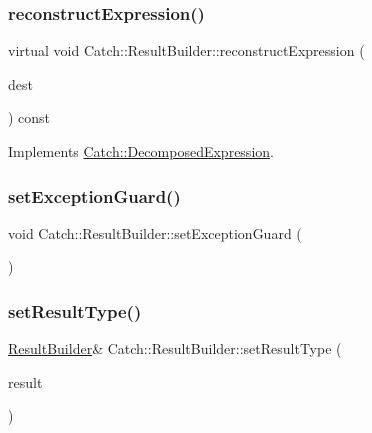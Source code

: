 \mbox{\label{class_catch_1_1_result_builder_a7d94b15cf04301a8617e7b16158b5d82}} 
\subsubsection{\texorpdfstring{reconstruct\+Expression()}{reconstructExpression()}}
{\footnotesize\ttfamily virtual void Catch\+::\+Result\+Builder\+::reconstruct\+Expression (\begin{DoxyParamCaption}\item[{\textbf{ std\+::string} \&}]{dest }\end{DoxyParamCaption}) const\hspace{0.3cm}{\ttfamily [virtual]}}



Implements \hyperlink{struct_catch_1_1_decomposed_expression_a9ce7f356dc96f11f80e40c82f5aa7e55}{Catch\+::\+Decomposed\+Expression}.

\mbox{\label{class_catch_1_1_result_builder_a87929808b4ec9b6cb5838edc1f27df17}} 
\subsubsection{\texorpdfstring{set\+Exception\+Guard()}{setExceptionGuard()}}
{\footnotesize\ttfamily void Catch\+::\+Result\+Builder\+::set\+Exception\+Guard (\begin{DoxyParamCaption}{ }\end{DoxyParamCaption})}

\mbox{\label{class_catch_1_1_result_builder_af896e372db9d7fc90ddeceff3ad110d0}} 
\subsubsection{\texorpdfstring{set\+Result\+Type()}{setResultType()}\hspace{0.1cm}{\footnotesize\ttfamily [1/2]}}
{\footnotesize\ttfamily \hyperlink{class_catch_1_1_result_builder}{Result\+Builder}\& Catch\+::\+Result\+Builder\+::set\+Result\+Type (\begin{DoxyParamCaption}\item[{\hyperlink{struct_catch_1_1_result_was_a624e1ee3661fcf6094ceef1f654601ef}{Result\+Was\+::\+Of\+Type}}]{result }\end{DoxyParamCaption})}

